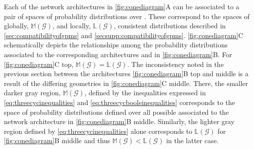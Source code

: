 Each of the network architectures in \autoref{fig:conediagram}A can be associated to a pair of spaces of probability distributions over \gnpm{}. These correspond to the spaces of globally, $\mathbb{M}(\mathcal{G})$, and locally, $\mathbb{L}(\mathcal{G})$, consistent distributions described in \autoref{sec:compatibilityofgpms} and \autoref{secsupp:compatibilityofgpms}. \autoref{fig:conediagram}C schematically depicts the relationships among the probability distributions associated to the corresponding architectures and \gnpm{} in \autoref{fig:conediagram}B. For \autoref{fig:conediagram}C top, $\mathbb{M}(\mathcal{G}) = \mathbb{L}(\mathcal{G})$. The inconsistency noted in the previous section between the architectures \autoref{fig:conediagram}B top and middle is a result of the differing geometries in \autoref{fig:conediagram}C middle. There, the smaller darker gray region, $\mathbb{M}(\mathcal{G})$, defined by the inequalities expressed in \autoref{eq:threecycinequalities} and \autoref{eq:threecycbooleinequalities} corresponds to the space of probability distributions defined over all possible \gnpm{} associated to the network architecture in \autoref{fig:conediagram}B middle. Similarly, the lighter gray region defined by \autoref{eq:threecycinequalities} alone corresponds to $\mathbb{L}(\mathcal{G})$ for \autoref{fig:conediagram}B middle and thus $\mathbb{M}(\mathcal{G}) < \mathbb{L}(\mathcal{G})$ in the latter case.


